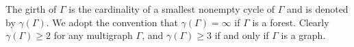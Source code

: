 The girth of $\Gamma$ is the cardinality of a smallest nonempty cycle of $\Gamma$ and is denoted by $\gamma(\Gamma)$. We adopt the convention that $\gamma(\Gamma) = \infty$ if $\Gamma$ is a forest. Clearly $\gamma(\Gamma) \geq 2$ for any multigraph $\Gamma$, and $\gamma(\Gamma) \geq 3$ if and only if $\Gamma$ is a graph.
